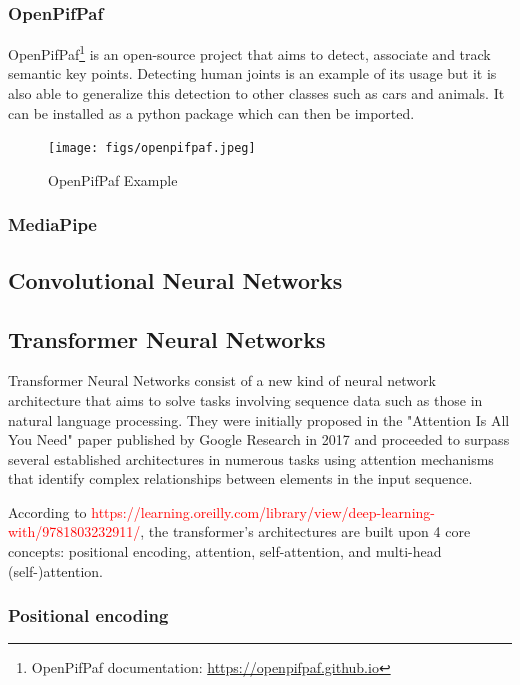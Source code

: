\subsubsection{OpenPifPaf}

OpenPifPaf\cite{Kreiss2021,Kreiss2019}\footnote{OpenPifPaf documentation: \url{https://openpifpaf.github.io}} is an open-source project that aims to detect, associate and track semantic key points. Detecting human joints is an example of its usage but it is also able to generalize this detection to other classes such as cars and animals. It can be installed as a python package which can then be imported.

\begin{figure}[h]
\centerline{\texttt{[image: figs/openpifpaf.jpeg]}}
\caption[OpenPifPaf Example]{OpenPifPaf Example \cite{Kreiss2021}}
\label{openpifpaf}
\end{figure}

\subsubsection{MediaPipe}

\subsection{Convolutional Neural Networks}

\subsection{Transformer Neural Networks}
\label{subsection:transformer_neural_networks}

Transformer Neural Networks consist of a new kind of neural network architecture that aims to solve tasks involving sequence data such as those in natural language processing. They were initially proposed in the "Attention Is All You Need" paper published by Google Research in 2017\cite{Vaswani2017} and proceeded to surpass several established architectures in numerous tasks using attention mechanisms that identify complex relationships between elements in the input sequence.

According to \textcolor{red}{https://learning.oreilly.com/library/view/deep-learning-with/9781803232911/}, the transformer's architectures are built upon 4 core concepts: positional encoding, attention, self-attention, and multi-head (self-)attention.

\subsubsection{Positional encoding}


